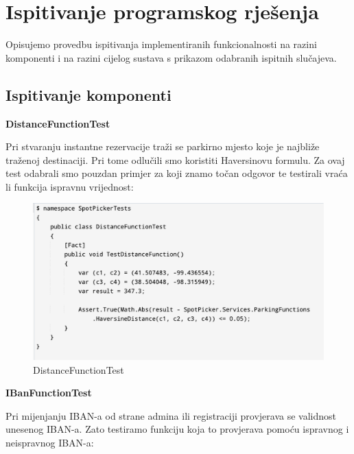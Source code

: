 			\eject 
		
	
		\section{Ispitivanje programskog rješenja}
			
			
			
			 {Opisujemo provedbu ispitivanja implementiranih funkcionalnosti na razini komponenti i na razini cijelog sustava s prikazom odabranih ispitnih slučajeva.}
	
			
			\subsection{Ispitivanje komponenti}
			
			\textbf{DistanceFunctionTest}
			
			{Pri stvaranju instantne rezervacije traži se parkirno mjesto koje je najbliže traženoj destinaciji. Pri tome odlučili smo koristiti Haversinovu formulu. Za ovaj test odabrali smo pouzdan primjer za koji znamo točan odgovor te testirali vraća li funkcija ispravnu vrijednost:}
			
			\begin{figure}[h]
				\centering
				\includegraphics[width=\textwidth,keepaspectratio]{slike/kod1.png}
				\caption{DistanceFunctionTest}
				\label{fig:kod1}
			\end{figure}
			
			
			\textbf{IBanFunctionTest}
			
			{Pri mijenjanju IBAN-a od strane admina ili registraciji provjerava se validnost unesenog IBAN-a. Zato testiramo funkciju koja to provjerava pomoću ispravnog i neispravnog IBAN-a:}
			
			
		
